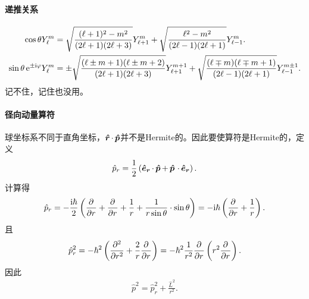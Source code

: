 \paragraph{递推关系}
\begin{align}\label{costhetaYlm}
	\cos\theta Y_\ell^m&=\sqrt{\frac{(\ell+1)^2-m^2}{(2\ell+1)(2\ell+3)}}Y_{\ell+1}^m+\sqrt{\frac{\ell^2-m^2}{(2\ell-1)(2\ell+1)}}Y_{\ell-1}^m.\\
	\sin\theta\e{\pm\i\varphi}Y_\ell^m&=\pm\sqrt{\frac{(\ell\pm m+1)(\ell\pm m+2)}{(2\ell+1)(2\ell+3)}}Y_{\ell+1}^{m+1}+\sqrt{\frac{(\ell\mp m)(\ell\mp m+1)}{(2\ell-1)(2\ell+1)}}Y_{\ell-1}^{m\pm 1}.
\end{align}
记不住，记住也没用。
\paragraph{径向动量算符}球坐标系不同于直角坐标，$\qo r\cdot\,\qo p$并不是Hermite的。因此要使算符是Hermite的，定义
\[
	\hat p_r=\frac12\kh{\qo{e_r}\cdot\,\qo p+\,\qo p\,\cdot\,\qo{e_r}}.
\]
计算得
\begin{align}
	\hat p_r=-\frac{\i\hbar}2\kh{\pp r+\pp r+\frac1r+\frac1{r\sin\theta}\cdot\sin\theta}=-\i\hbar\kh{\pp r+\frac1r}.
\end{align}
且
\[
	\hat p_r^2=-\hbar^2\kh{\pp[2]r+\frac2r\pp r}=-\hbar^2\frac1{r^2}\pp r\kh{r^2\pp r}.
\]
因此
\begin{align}
	\hat p^2=\hat p_r^2+\frac{\hat L^2}{r^2}.
\end{align}